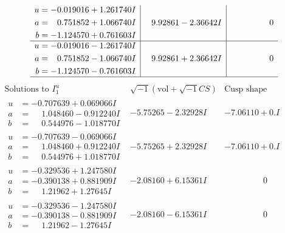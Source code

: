 \documentclass[1p]{elsarticle_modified}
\theoremstyle{definition}
\newcommand{\I}{\sqrt{-1}}
\begin{document}
$$\begin{array}{c|c|c}
\begin{aligned}
u &= -0.019016 + 1.261740 I \\
a &= \phantom{-}0.751852 + 1.066740 I \\
b &= -1.124570 + 0.761603 I\end{aligned}
 & \phantom{-}9.92861 - 2.36642 I & \phantom{-0.000000 } 0 \\ \hline\begin{aligned}
u &= -0.019016 - 1.261740 I \\
a &= \phantom{-}0.751852 - 1.066740 I \\
b &= -1.124570 - 0.761603 I\end{aligned}
 & \phantom{-}9.92861 + 2.36642 I & \phantom{-0.000000 } 0\\
 \hline 
 \end{array}$$\newpage$$\begin{array}{c|c|c}  
\text{Solutions to }I^u_{1}& \I (\text{vol} + \sqrt{-1}CS) & \text{Cusp shape}\\
 \hline 
\begin{aligned}
u &= -0.707639 + 0.069066 I \\
a &= \phantom{-}1.048460 - 0.912240 I \\
b &= \phantom{-}0.544976 - 1.018770 I\end{aligned}
 & -5.75265 - 2.32928 I & -7.06110 + 0. I\phantom{ +0.000000I} \\ \hline\begin{aligned}
u &= -0.707639 - 0.069066 I \\
a &= \phantom{-}1.048460 + 0.912240 I \\
b &= \phantom{-}0.544976 + 1.018770 I\end{aligned}
 & -5.75265 + 2.32928 I & -7.06110 + 0. I\phantom{ +0.000000I} \\ \hline\begin{aligned}
u &= -0.329536 + 1.247580 I \\
a &= -0.390138 + 0.881909 I \\
b &= \phantom{-}1.21962 + 1.27645 I\end{aligned}
 & -2.08160 + 6.15361 I & \phantom{-0.000000 } 0 \\ \hline\begin{aligned}
u &= -0.329536 - 1.247580 I \\
a &= -0.390138 - 0.881909 I \\
b &= \phantom{-}1.21962 - 1.27645 I\end{aligned}
 & -2.08160 - 6.15361 I & \phantom{-0.000000 } 0 \\ \hline\begin{aligned}

\end{aligned}
\end{array}$$
\end{document}
